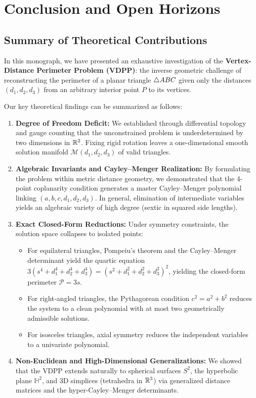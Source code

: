 \chapter{Conclusion and Open Horizons}
\label{ch:conclusion}

\section{Summary of Theoretical Contributions}
In this monograph, we have presented an exhaustive investigation of the \textbf{Vertex-Distance Perimeter Problem (VDPP)}: the inverse geometric challenge of reconstructing the perimeter of a planar triangle $\triangle ABC$ given only the distances $(d_1, d_2, d_3)$ from an arbitrary interior point $P$ to its vertices.

Our key theoretical findings can be summarized as follows:
\begin{enumerate}
    \item \textbf{Degree of Freedom Deficit:} We established through differential topology and gauge counting that the unconstrained problem is underdetermined by two dimensions in $\mathbb{R}^2$. Fixing rigid rotation leaves a one-dimensional smooth solution manifold $\mathcal{M}(d_1, d_2, d_3)$ of valid triangles.
    \item \textbf{Algebraic Invariants and Cayley--Menger Realization:} By formulating the problem within metric distance geometry, we demonstrated that the 4-point coplanarity condition generates a master Cayley--Menger polynomial linking $(a, b, c, d_1, d_2, d_3)$. In general, elimination of intermediate variables yields an algebraic variety of high degree (sextic in squared side lengths).
    \item \textbf{Exact Closed-Form Reductions:} Under symmetry constraints, the solution space collapses to isolated points:
    \begin{itemize}
        \item For equilateral triangles, Pompeiu's theorem and the Cayley--Menger determinant yield the quartic equation $3(s^4 + d_1^4 + d_2^4 + d_3^4) = (s^2 + d_1^2 + d_2^2 + d_3^2)^2$, yielding the closed-form perimeter $\mathcal{P} = 3s$.
        \item For right-angled triangles, the Pythagorean condition $c^2 = a^2 + b^2$ reduces the system to a clean polynomial with at most two geometrically admissible solutions.
        \item For isosceles triangles, axial symmetry reduces the independent variables to a univariate polynomial.
    \end{itemize}
    \item \textbf{Non-Euclidean and High-Dimensional Generalizations:} We showed that the VDPP extends naturally to spherical surfaces $S^2$, the hyperbolic plane $\mathbb{H}^2$, and 3D simplices (tetrahedra in $\mathbb{R}^3$) via generalized distance matrices and the hyper-Cayley--Menger determinants.
\end{enumerate}

